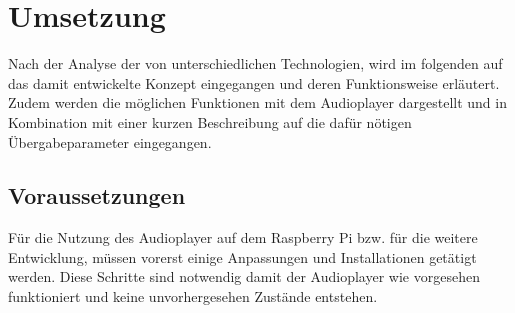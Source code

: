 
\chapter{Umsetzung}

Nach der Analyse der von unterschiedlichen Technologien, wird im folgenden auf das damit entwickelte Konzept eingegangen und deren Funktionsweise erläutert. Zudem werden die möglichen Funktionen mit dem Audioplayer dargestellt und in Kombination mit einer kurzen Beschreibung auf die dafür nötigen Übergabeparameter eingegangen.


\section{Voraussetzungen}
Für die Nutzung des Audioplayer auf dem Raspberry Pi bzw. für die weitere Entwicklung, müssen vorerst einige Anpassungen und Installationen getätigt werden. Diese Schritte sind notwendig damit der Audioplayer wie vorgesehen funktioniert und keine unvorhergesehen Zustände entstehen.

